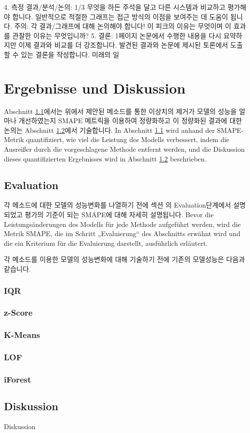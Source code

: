 4. 측정 결과/분석/논의: 1/3
무엇을 하든 주석을 달고 다른 시스템과 비교하고 평가해야 합니다.
일반적으로 적절한 그래프는 접근 방식의 이점을 보여주는 데 도움이 됩니다.
주의: 각 결과/그래프에 대해 논의해야 합니다! 이 피크의 이유는 무엇이며 이 효과를 관찰한 이유는 무엇입니까?
5. 결론: 1페이지
논문에서 수행한 내용을 다시 요약하지만 이제 결과와 비교를 더 강조합니다.
발견된 결과와 논문에 제시된 토론에서 도출할 수 있는 결론을 작성합니다.
미래의 일


\chapterpage\chapter{Ergebnisse und Diskussion}
    Abschnitt \ref{sec:Evaluation}에서는 위에서 제안된 메소드를 통한 이상치의 제거가 모델의 성능을 얼마나 개선하였는지 SMAPE 메트릭을 이용하여 정량화하고 이 정량화된 결과에 대한 논의는 Abschnitt \ref{sec:Diskussion}에서 기술합니다.
    In Abschnitt \ref{sec:Evaluation} wird anhand der SMAPE-Metrik quantifiziert, wie viel die Leistung des Modells verbessert, indem die Ausreißer durch die vorgeschlagene Methode entfernt werden, und die Diskussion dieses quantifizierten Ergebnisses wird in Abschnitt \ref{sec:Diskussion} beschrieben.

    \section{Evaluation}
    \label{sec:Evaluation}
        각 메소드에 대한 모델의 성능변화를 나열하기 전에 섹션 \label{sec:Modellierung der Feinstaubkonzentration}의 Evaluation단계에서 설명되었고 평가의 기준이 되는 SMAPE에 대해 자세히 설명됩니다.
        Bevor die Leistungsänderungen des Modells für jede Methode aufgeführt werden, wird die Metrik SMAPE, die im Schritt „Evaluierung“ des Abschnitts \label{sec:Modellierung der Feinstaubkonzentration} erwähnt wird und die ein Kriterium für die Evaluierung darstellt, ausführlich erläutert.




        각 메소드를 이용한 모델의 성능변화에 대해 기술하기 전에 기존의 모델성능은 다음과 같습니다.
        
        \subsection*{IQR}
        
        \subsection*{z-Score}
        
        \subsection*{K-Means}
        
        \subsection*{LOF}
        
        \subsection*{iForest}
        
    \section{Diskussion}
    \label{sec:Diskussion}
        Diskussion